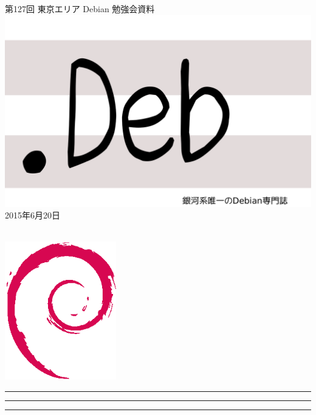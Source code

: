 \documentclass[mingoth,a4paper]{jsarticle}
\newcommand{\debmtgyear}{2015}
\newcommand{\debmtgmonth}{6}
\newcommand{\debmtgdate}{20}
\newcommand{\debmtgnumber}{127}
\begin{document}
\begin{titlepage}
\thispagestyle{empty}

\vspace*{-2cm}
第\debmtgnumber{}回 東京エリア Debian 勉強会資料\\
\hspace*{-2cm}
\includegraphics{image2012-natsu/dotdeb.pdf}\\
\hfill{}\debmtgyear{}年\debmtgmonth{}月\debmtgdate{}日

\\

\vspace*{-2cm}
\hfill{}\includegraphics[height=6cm]{image200502/openlogo-nd.eps}
\end{titlepage}

\newpage

\begin{minipage}[b]{0.2\hsize}
 \colorbox{titleback}{}
\end{minipage}
\begin{minipage}[b]{0.8\hsize}
\hrule
\vspace{2mm}
\hrule
\begin{multicols}{2}
\tableofcontents
\end{multicols}
\vspace{2mm}
\hrule
\end{minipage}
\end{document}
